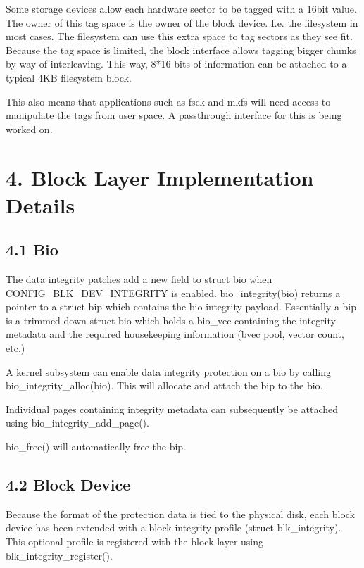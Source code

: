 \documentclass[a4paper,11pt,english]{sphinxmanual}
\begin{document}
Some storage devices allow each hardware sector to be tagged with a
16\sphinxhyphen{}bit value.  The owner of this tag space is the owner of the block
device.  I.e. the filesystem in most cases.  The filesystem can use
this extra space to tag sectors as they see fit.  Because the tag
space is limited, the block interface allows tagging bigger chunks by
way of interleaving.  This way, 8*16 bits of information can be
attached to a typical 4KB filesystem block.

This also means that applications such as fsck and mkfs will need
access to manipulate the tags from user space.  A passthrough
interface for this is being worked on.


\section{4. Block Layer Implementation Details}
\label{\detokenize{data-integrity:block-layer-implementation-details}}

\subsection{4.1 Bio}
\label{\detokenize{data-integrity:bio}}
The data integrity patches add a new field to struct bio when
CONFIG\_BLK\_DEV\_INTEGRITY is enabled.  bio\_integrity(bio) returns a
pointer to a struct bip which contains the bio integrity payload.
Essentially a bip is a trimmed down struct bio which holds a bio\_vec
containing the integrity metadata and the required housekeeping
information (bvec pool, vector count, etc.)

A kernel subsystem can enable data integrity protection on a bio by
calling bio\_integrity\_alloc(bio).  This will allocate and attach the
bip to the bio.

Individual pages containing integrity metadata can subsequently be
attached using bio\_integrity\_add\_page().

bio\_free() will automatically free the bip.


\subsection{4.2 Block Device}
\label{\detokenize{data-integrity:block-device}}
Because the format of the protection data is tied to the physical
disk, each block device has been extended with a block integrity
profile (struct blk\_integrity).  This optional profile is registered
with the block layer using blk\_integrity\_register().
\end{document}
